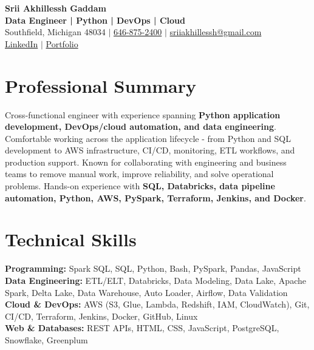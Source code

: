 \documentclass[letterpaper,10pt]{article}
\begin{document}
\fontsize{9.35pt}{10.45pt}\selectfont

\begin{center}
    {\LARGE \textbf{Srii Akhillessh Gaddam}} \\[-1pt]
    \textbf{Data Engineer | Python | DevOps | Cloud} \\[2pt]
    Southfield, Michigan 48034 $|$
    \href{tel:6468752400}{646-875-2400} $|$
    \href{mailto:sriiakhillessh@gmail.com}{sriiakhillessh@gmail.com} \\[1pt]
    \href{https://www.linkedin.com/in/srii-akhiilessh-gaddam-b48668191/}{LinkedIn} $|$
    \href{https://sriiakhillesshg.github.io/portfolio/}{Portfolio}
\end{center}
\vspace{-8pt}

\section{Professional Summary}
\small{Cross-functional engineer with experience spanning \textbf{Python application development, DevOps/cloud automation, and data engineering}. Comfortable working across the application lifecycle - from Python and SQL development to AWS infrastructure, CI/CD, monitoring, ETL workflows, and production support. Known for collaborating with engineering and business teams to remove manual work, improve reliability, and solve operational problems. Hands-on experience with \textbf{SQL, Databricks, data pipeline automation, Python, AWS, PySpark, Terraform, Jenkins, and Docker}.}

\section{Technical Skills}
\small{
\textbf{Programming:} Spark SQL, SQL, Python, Bash, PySpark, Pandas, JavaScript \\
\textbf{Data Engineering:} ETL/ELT, Databricks, Data Modeling, Data Lake, Apache Spark, Delta Lake, Data Warehouse, Auto Loader, Airflow, Data Validation \\
\textbf{Cloud \& DevOps:} AWS (S3, Glue, Lambda, Redshift, IAM, CloudWatch), Git, CI/CD, Terraform, Jenkins, Docker, GitHub, Linux \\
\textbf{Web \& Databases:} REST APIs, HTML, CSS, JavaScript, PostgreSQL, Snowflake, Greenplum
}
\end{document}
